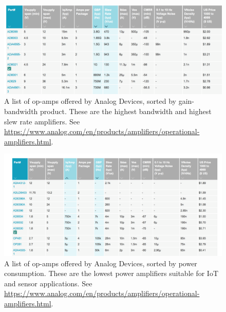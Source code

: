 \begin{figure}[t]
\centering
\includegraphics[width=\columnwidth]{opamp_table.png}
\caption{A list of op-amps offered by Analog Devices, sorted by gain-bandwidth product.  These are the highest bandwidth and highest slew rate amplifiers.  See \url{https://www.analog.com/en/products/amplifiers/operational-amplifiers.html}.}
\label{fig:opamp_table}
\end{figure}
\begin{figure}[H]
\centering
\includegraphics[width=\columnwidth]{opamp_lowpower.png}
\caption{A list of op-amps offered by Analog Devices, sorted by power consumption.  These are the lowest power amplifiers suitable for IoT and sensor applications.  See \url{https://www.analog.com/en/products/amplifiers/operational-amplifiers.html}.}
\label{fig:opamp_lowpower}
\end{figure}
